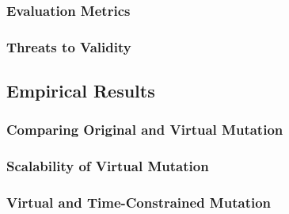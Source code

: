 \subsubsection{Evaluation Metrics}
\label{sec:evaluation-metrics}

\subsubsection{Threats to Validity}
\label{sec:threats-to-validity}


\subsection{Empirical Results}
\label{sec:empirical-results}


\subsubsection{Comparing Original and Virtual Mutation}
\label{sec:empirical-study-RQ-original-virtual-time}



\subsubsection{Scalability of Virtual Mutation}
\label{sec:empirical-study-RQ-scalability-mutants-tests}



\subsubsection{Virtual and Time-Constrained Mutation}
\label{sec:empirical-study-RQ-virtual-time-constrained-virtual}


